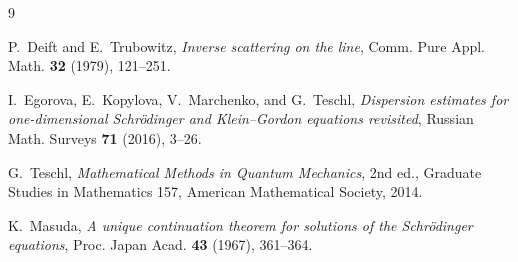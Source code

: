 \documentclass[11pt]{amsart}
\numberwithin{equation}{section}
\theoremstyle{remark}
\begin{document}
\begin{thebibliography}{9}

P.~Deift and E.~Trubowitz,
\emph{Inverse scattering on the line},
Comm. Pure Appl. Math. \textbf{32} (1979), 121--251.

I.~Egorova, E.~Kopylova, V.~Marchenko, and G.~Teschl,
\emph{Dispersion estimates for one-dimensional Schr\"odinger and
Klein--Gordon equations revisited},
Russian Math. Surveys \textbf{71} (2016), 3--26.

G.~Teschl,
\emph{Mathematical Methods in Quantum Mechanics},
2nd ed., Graduate Studies in Mathematics 157,
American Mathematical Society, 2014.

K.~Masuda,
\emph{A unique continuation theorem for solutions of the Schr\"odinger
equations},
Proc. Japan Acad. \textbf{43} (1967), 361--364.

\end{thebibliography}
\end{document}

